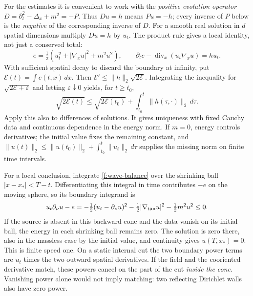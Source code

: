 For the estimates it is convenient to work with the \emph{positive evolution operator} $D=\partial_t^2-\Delta_x+m^2=-P$. Thus $Du=h$ means $Pu=-h$; every inverse of $P$ below is the \emph{negative} of the corresponding inverse of $D$. For a smooth real solution in $d$ spatial dimensions multiply $Du=h$ by $u_t$. The product rule gives a local identity, not just a conserved total:
\begin{equation}
 e=\tfrac12(u_t^2+|\nabla_x u|^2+m^2u^2),\qquad
 \partial_t e-\operatorname{div}_x(u_t\nabla_xu)=h u_t .\label{f:wave-balance}
\end{equation}
With sufficient spatial decay to discard the boundary at infinity, put $\mathcal E(t)=\int e(t,x)\,dx$. Then $\mathcal E'\leq\|h\|_2\sqrt{2\mathcal E}$. Integrating the inequality for $\sqrt{2\mathcal E+\varepsilon}$ and letting $\varepsilon\downarrow0$ yields, for $t\geq t_0$,
\begin{equation}
 \sqrt{2\mathcal E(t)}\leq \sqrt{2\mathcal E(t_0)}+\int_{t_0}^t\|h(\tau,\cdot)\|_2\,d\tau .\label{f:energy-estimate}
\end{equation}
Apply this also to differences of solutions. It gives uniqueness with fixed Cauchy data and continuous dependence in the energy norm. If $m=0$, energy controls derivatives; the initial value fixes the remaining constant, and $\|u(t)\|_2\leq\|u(t_0)\|_2+\int_{t_0}^t\|u_t\|_2\,d\tau$ supplies the missing norm on finite time intervals.

For a local conclusion, integrate \eqref{f:wave-balance} over the shrinking ball $|x-x_*|<T-t$. Differentiating this integral in time contributes $-e$ on the moving sphere, so its boundary integrand is
\[
 u_t\partial_\nu u-e=-\tfrac12(u_t-\partial_\nu u)^2-\tfrac12|\nabla_{\rm tan}u|^2-\tfrac12m^2u^2\leq0 .
\]
If the source is absent in this backward cone and the data vanish on its initial ball, the energy in each shrinking ball remains zero. The solution is zero there, also in the massless case by the initial value, and continuity gives $u(T,x_*)=0$. This is finite speed one. On a static internal cut the two boundary power terms are $u_t$ times the two outward spatial derivatives. If the field and the cooriented derivative match, these powers cancel on the part of the cut \emph{inside the cone}. Vanishing power alone would not imply matching: two reflecting Dirichlet walls also have zero power.

